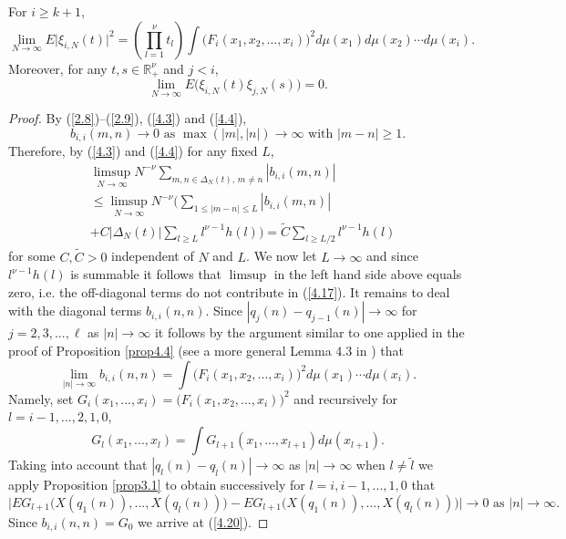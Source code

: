 \begin{proposition}\label{prop4.5} For $i\ge k+1$, 
\begin{equation}\label{4.17}
\lim_{N\to\infty}E\big |\xi_{i,N}(t)|^2=(\prod_{l=1}^\nu t_l)\int\big(F_i(x_1, 
x_2,\ldots, x_i)\big)^2d\mu(x_1)d\mu(x_2)\cdots d\mu(x_i).
\end{equation}
Moreover, for any $t,s\in{{\mathbb R}}^\nu_+$ and $j<i$,
\begin{equation}\label{4.18}
\lim_{N\to\infty}E\big (\xi_{i,N}(t)\xi_{j,N}(s)\big )=0.
\end{equation}
\end{proposition}
\begin{proof} By (\ref{2.8})--(\ref{2.9}), (\ref{4.3}) and (\ref{4.4}),
\[
b_{i,i}(m,n)\to 0\,\,\mbox{as}\,\,\max(|m|,|n|)\to\infty\,\,\mbox{with}\,\,
|m-n|\geq 1.
\]
Therefore, by (\ref{4.3}) and (\ref{4.4}) for any fixed $L$,
\begin{eqnarray*}
&\limsup_{N\to\infty}N^{-\nu}\sum_{m,n\in{{\Delta}}_N(t),\, m\ne n}|b_{i,i}(m,n)|\\
&\leq\limsup_{N\to\infty}N^{-\nu}\big(\sum_{1\leq |m-n|\leq L}|b_{i,i}(m,n)|\\
&+C|{{\Delta}}_N(t)|\sum_{l\geq L}l^{\nu-1}h(l)\big)=\tilde C
\sum_{l\geq L/2}l^{\nu-1}h(l)
\end{eqnarray*}
for some $C,\tilde C>0$ independent of $N$ and $L$. We now let $L\to\infty$ and since 
 $l^{\nu-1}h(l)$ is summable it follows that $\limsup$ in the left hand side
above equals zero, i.e. the off-diagonal terms do not contribute in 
(\ref{4.17}). It remains to deal with the diagonal terms $b_{i,i}(n,n)$.
Since $|q_j(n)-q_{j-1}(n)|\to\infty$ for $j=2,3,...,\ell$ as $|n|\to\infty$
it follows by the argument similar to one applied in the proof of Proposition
\ref{prop4.4} (see a more general Lemma 4.3 in \cite{KV}) that 
\begin{equation}\label{4.20}
\lim_{|n|\to\infty}b_{i,i}(n,n)=\int\big(F_i(x_1,x_2,...,x_i)\big)^2d\mu(x_1)
\cdots d\mu(x_i).
\end{equation}
 Namely, set
$G_i(x_1,...,x_i)=\big(F_i(x_1,x_2,...,x_i)\big)^2$ and recursively for
$l=i-1,...,2,1,0$, 
\[
G_l(x_1,...,x_l)=\int G_{l+1}(x_1,...,x_{l+1})d\mu(x_{l+1}).
\]
Taking into account that $|q_l(n)-q_{\tilde l}(n)|\to\infty$ as $|n|\to\infty$ 
when $l\ne\tilde l$ we apply Proposition \ref{prop3.1} to obtain successively 
for $l=i,i-1,...,1,0$ that
\[
\big\vert EG_{l+1}\big(X(q_1(n)),...,X(q_l(n))\big)-EG_{l+1}\big(X(q_1(n)),...,
X(q_l(n))\big)\big\vert\to 0\,\,\mbox{as}\,\, |n|\to\infty.
\]
Since $b_{i,i}(n,n)=G_0$ we arrive at (\ref{4.20}).


\end{proof}
